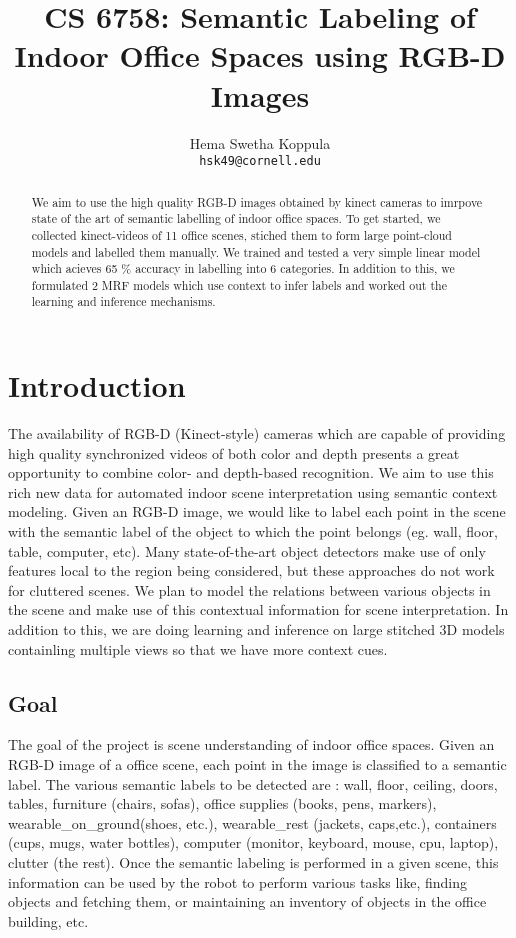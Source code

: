 \documentclass[11pt]{article} %
\title{CS 6758: Semantic Labeling of Indoor Office Spaces using RGB-D Images}
\author{
Hema Swetha Koppula \\
 \texttt{hsk49@cornell.edu}
}
\begin{document}
\maketitle

\begin{abstract}
We aim to use the high quality RGB-D images obtained by kinect cameras to imrpove state of the art of semantic labelling of indoor office spaces.
To get started, we  collected kinect-videos of 11 office scenes, stiched them to form large point-cloud models and labelled them manually.
We trained and tested a very simple linear model which acieves 65 \% accuracy in labelling into 6 categories. In addition to this, we formulated 2 MRF models which use context to infer labels and worked out the learning and inference mechanisms. 
\end{abstract}

\section{Introduction}


  
  The availability of  RGB-D (Kinect-style) cameras \cite{kinect} which are capable of providing high quality synchronized 
  videos of both color and depth presents a great opportunity to combine color- and depth-based recognition. We aim 
  to use this rich new data for automated indoor scene interpretation using semantic context modeling. Given an RGB-D 
  image, we would like to label each point in the scene with the semantic label of the object to which the point belongs
  (eg. wall, floor, table, computer, etc). Many state-of-the-art object detectors make use of only features local to the region being 
  considered, but these approaches do not work for cluttered scenes. We plan to model the relations between various objects 
  in the scene and make use of this contextual information for scene interpretation. In addition to this, we are doing learning and
  inference on large stitched 3D models containling multiple views so that we have more context cues.

   \subsection{Goal}
     The goal of the project is scene understanding of indoor office spaces. Given an RGB-D image of a office scene, each point in the 
     image is classified to a semantic label. The various semantic labels to be detected are : wall, floor, ceiling, doors, tables, furniture 
     (chairs, sofas), office supplies (books, pens, markers), wearable\_on\_ground(shoes, etc.), wearable\_rest (jackets, caps,etc.), 
     containers (cups, mugs, water bottles), computer (monitor, keyboard, mouse, cpu, laptop), clutter (the rest). Once the semantic labeling 
     is performed in a given scene, this information can be used by the robot to perform various tasks like, finding objects and fetching them, 
     or maintaining an inventory of objects in the office building, etc.
\end{document}
